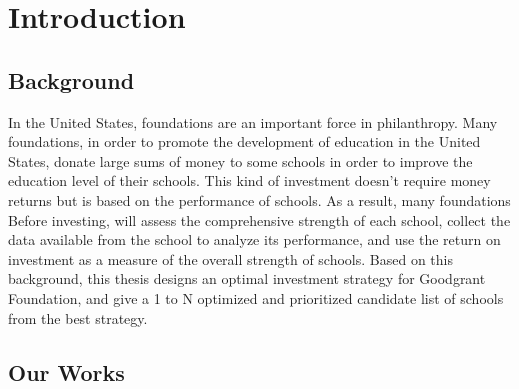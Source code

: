 \documentclass{mcmthesis}
\begin{document}
\maketitle
\tableofcontents
\newpage

\section{Introduction}


\subsection{Background}

\par In the United States, foundations are an important force in philanthropy. Many foundations, in order to promote the development of education in the United States, donate large sums of money to some schools in order to improve the education level of their schools. This kind of investment doesn’t require money returns but is based on the performance of schools. As a result, many foundations Before investing, will assess the comprehensive strength of each school, collect the data available from the school to analyze its performance, and use the return on investment as a measure of the overall strength of schools. Based on this background, this thesis designs an optimal investment strategy for Goodgrant Foundation, and give a 1 to N optimized and prioritized candidate list of schools from the best strategy.

\subsection{Our Works}
\end{document}
